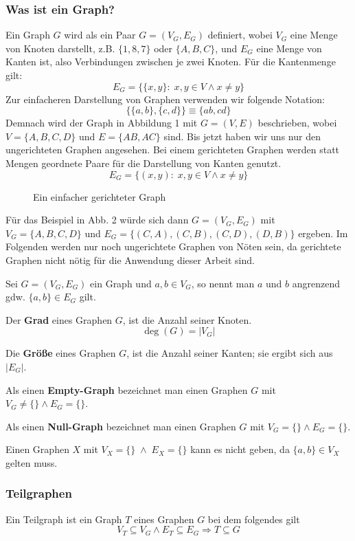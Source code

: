 \subsubsection{Was ist ein Graph?}
Ein Graph $G$ wird als ein Paar $G=(V_G,E_G)$ definiert, wobei \(V_G\) eine Menge von Knoten darstellt, z.B. \(\{1, 8, 7\}\) oder \(\{A, B, C\}\), und \(E_G\) eine Menge von Kanten ist, also Verbindungen zwischen je zwei Knoten. Für die Kantenmenge gilt:
$$E_G = \{\{x, y\} \colon \; x,y \in V \wedge x \neq y \}$$
Zur einfacheren Darstellung von Graphen verwenden wir folgende Notation:
$$\{\{a, b\}, \{c, d\}\} \equiv \{ab, cd\}$$
Demnach wird der Graph in Abbildung 1 mit \(G=(V,E)\) beschrieben, wobei \(V=\{A,B,C,D\}\) und \(E=\{AB,AC\}\) sind. 
\newpage
Bis jetzt haben wir uns nur den ungerichteten Graphen angesehen. Bei einem gerichteten Graphen werden statt Mengen geordnete Paare für die Darstellung von Kanten genutzt. 
$$E_G = \{(x, y) \colon \; x,y \in V \wedge x \neq y \}$$
\begin{figure}[h]
    \centering
    
    \caption{Ein einfacher gerichteter Graph}
\end{figure}
Für das Beispiel in Abb. 2 würde sich dann $G=(V_G, E_G)$ mit $V_G=\{A,B,C,D\}$ und $E_G=\{(C,A), (C,B), (C,D), (D,B)\}$ ergeben. Im Folgenden werden nur noch ungerichtete Graphen von Nöten sein, da gerichtete Graphen nicht nötig für die Anwendung dieser Arbeit sind. 
\begin{definition}
    Sei $G=(V_G, E_G)$ ein Graph und $a, b \in V_G$, so nennt man $a$ und $b$ angrenzend gdw. $\{a,b\} \in E_G$ gilt.
\end{definition}
\begin{definition}
    Der \textbf{Grad} eines Graphen $G$, ist die Anzahl seiner Knoten. 
    $$\deg(G)=|V_G|$$
\end{definition}
\begin{definition}
    Die \textbf{Größe} eines Graphen $G$, ist die Anzahl seiner Kanten; sie ergibt sich aus $|E_G|$.
\end{definition}
\begin{definition}
    Als einen \textbf{Empty-Graph} bezeichnet man einen Graphen $G$ mit $V_G \neq \{\} \wedge E_G=\{\}$.\\
\end{definition}
\begin{definition}
     Als einen \textbf{Null-Graph} bezeichnet man einen Graphen $G$ mit $V_G=\{\} \wedge E_G=\{\}$.
\end{definition}
Einen Graphen $X$ mit $V_X = \{\} \; \wedge \; E_X =\{\}$ kann es nicht geben, da $\{a,b\} \in V_X$ gelten muss.
\newpage
\subsubsection{Teilgraphen}
Ein Teilgraph ist ein Graph $T$ eines Graphen $G$ bei dem folgendes gilt
$$V_T \subseteq V_G \wedge E_T \subseteq E_G \Rightarrow T \subseteq G$$